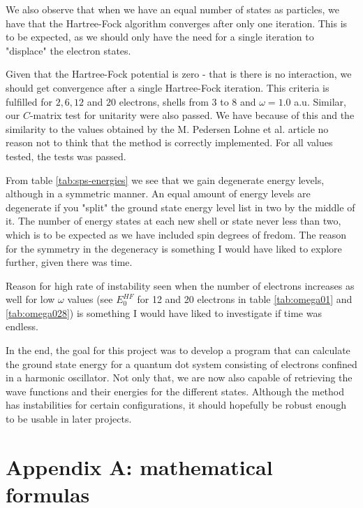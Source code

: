 \documentclass[11pt]{article}
\begin{document}
We also observe that when we have an equal number of states as particles, we have that the Hartree-Fock algorithm converges after only one iteration. This is to be expected, as we should only have the need for a single iteration to "displace" the electron states.

Given that the Hartree-Fock potential is zero - that is there is no interaction, we should get convergence after a single Hartree-Fock iteration. This criteria is fulfilled for $2,6,12$ and $20$ electrons, shells from $3$ to $8$ and $\omega=1.0$ a.u. Similar, our $C$-matrix test for unitarity were also passed. We have because of this and the similarity to the values obtained by the M. Pedersen Lohne et al. article \cite{PhysRevB.84.115302} no reason not to think that the method is correctly implemented. For all values tested, the tests was passed.

From table \ref{tab:sps-energies} we see that we gain degenerate energy levels, although in a symmetric manner. An equal amount of energy levels are degenerate if you "split" the ground state energy level list in two by the middle of it. The number of energy states at each new shell or state never less than two, which is to be expected as we have included spin degrees of fredom. The reason for the symmetry in the degeneracy is something I would have liked to explore further, given there was time.

Reason for high rate of instability seen when the number of electrons increases as well for low $\omega$ values (see $E^{HF}_0$ for 12 and 20 electrons in table \ref{tab:omega01} and \ref{tab:omega028}) is something I would have liked to investigate if time was endless.

In the end, the goal for this project was to develop a program that can calculate the ground state energy for a quantum dot system consisting of electrons confined in a harmonic oscillator. Not only that, we are now also capable of retrieving the wave functions and their energies for the different states. Although the method has instabilities for certain configurations, it should hopefully be robust enough to be usable in later projects.

\section{Appendix A: mathematical formulas}
\end{document}
